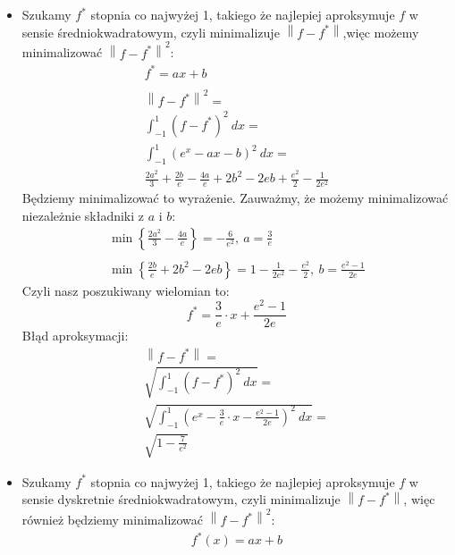 \documentclass[a4paper]{article}
\begin{document}
   \begin{itemize}
      \item
      Szukamy $f^{*}$ stopnia co najwyżej 1, takiego że najlepiej aproksymuje $f$ w sensie średniokwadratowym, czyli minimalizuje
      $\left\| f - f^{*} \right\|$,więc możemy minimalizować $\left\| f - f^{*} \right\|^{2}$:
      \begin{gather*}
         f^{*} = ax + b \\
         \\
         \left\| f - f^{*} \right\|^{2} = \\
         \int^{1}_{-1} (f - f^{*})^{2} \ dx = \\
         \int^{1}_{-1} (e^{x} - ax - b)^{2} \ dx = \\
         \frac{2 a^2}{3} + \frac{2b}{e} - \frac{4a}{e} + 2 b^{2} - 2 e b + \frac{e^2}{2} - \frac{1}{2 e ^{2}}
      \end{gather*}
      Będziemy minimalizować to wyrażenie.
      Zauważmy, że możemy minimalizować niezależnie składniki z $a$ i $b$:
      \begin{gather*}
         \min \left\{ \frac{2 a^2}{3} - \frac{4a}{e} \right\} =
         - \frac{6}{e^2}, \ a = \frac{3}{e} \\
         \\
         \min \left\{ \frac{2b}{e} + 2 b^{2} - 2 e b \right\} =
         1 - \frac{1}{2 e^{2}} - \frac{e^2}{2}, \ b = \frac{e^{2} - 1}{2e}
      \end{gather*}
      Czyli nasz poszukiwany wielomian to:
      \[
         f^{*} = \frac{3}{e} \cdot x + \frac{e^{2} - 1}{2e}
      \]
      Błąd aproksymacji:
      \begin{gather*}
         \left\| f - f^{*} \right\| = \\
         \sqrt{\int^{1}_{-1} \left( f - f^{*} \right)^{2} \ dx} = \\
         \sqrt{\int^{1}_{-1} \left( e^{x} - \frac{3}{e} \cdot x - \frac{e^{2} - 1}{2e} \right)^{2} \ dx} = \\
         \sqrt{1 - \frac{7}{e^{2}}}
      \end{gather*}
      \item
      Szukamy $f^{*}$ stopnia co najwyżej 1, takiego że najlepiej aproksymuje $f$ w sensie dyskretnie średniokwadratowym,
      czyli minimalizuje $\left\| f - f^{*} \right\|$, więc również będziemy minimalizować $\left\| f - f^{*} \right\|^{2}$:
      \begin{gather*}
         f^{*}(x) = ax + b \\

\end{gather*}
\end{itemize}
\end{document}
